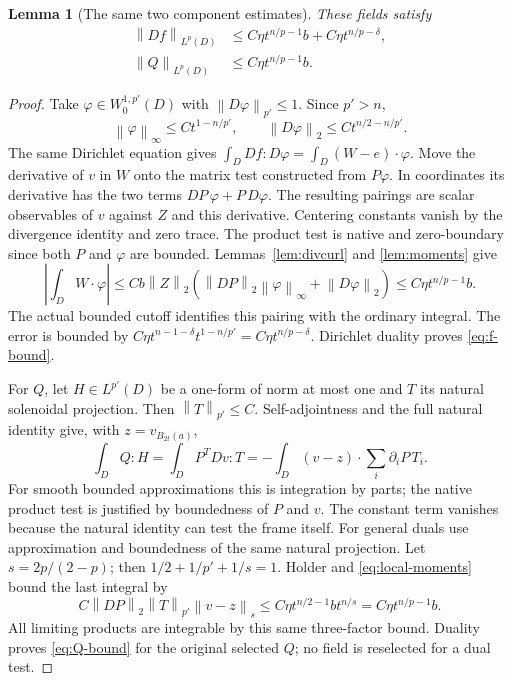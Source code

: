 \documentclass[11pt,a4paper]{article}
\numberwithin{equation}{section}
\newtheorem{lemma}[theorem]{Lemma}
\theoremstyle{definition}
\theoremstyle{remark}
\newcommand{\norm}[1]{\left\lVert#1\right\rVert}
\begin{document}
\begin{lemma}[The same two component estimates]\label{lem:field-bounds}
These fields satisfy
\begin{align}
 \norm{Df}_{L^p(D)}&\leq C\eta t^{n/p-1}b+C\eta t^{n/p-\delta},
                                                   \label{eq:f-bound}\\
 \norm Q_{L^p(D)}&\leq C\eta t^{n/p-1}b.\label{eq:Q-bound}
\end{align}
\end{lemma}
\begin{proof}
Take $\varphi\in W^{1,p'}_0(D)$ with $\norm{D\varphi}_{p'}\leq1$.
Since $p'>n$,
\begin{equation}\label{eq:test-scaling}
 \norm\varphi_\infty\leq Ct^{1-n/p'},\qquad
 \norm{D\varphi}_2\leq Ct^{n/2-n/p'}.
\end{equation}
The same Dirichlet equation gives
$\int_D Df:D\varphi=\int_D(W-e)\cdot\varphi$.
Move the derivative of $v$ in $W$ onto the matrix test constructed
from $P\varphi$. In coordinates its derivative has the two terms
$DP\,\varphi+P\,D\varphi$. The resulting pairings are scalar
observables of $v$ against $Z$ and this derivative. Centering constants
vanish by the divergence identity and zero trace. The product test is
native and zero-boundary since both $P$ and $\varphi$ are bounded.
Lemmas~\ref{lem:divcurl} and \ref{lem:moments} give
\[
 \left|\int_D W\cdot\varphi\right|
 \leq Cb\norm Z_2
       (\norm{DP}_2\norm\varphi_\infty+\norm{D\varphi}_2)
 \leq C\eta t^{n/p-1}b.
\]
The actual bounded cutoff identifies this pairing with the ordinary
integral. The error is bounded by
$C\eta t^{n-1-\delta}t^{1-n/p'}=C\eta t^{n/p-\delta}$.
Dirichlet duality proves \eqref{eq:f-bound}.

For $Q$, let $H\in L^{p'}(D)$ be a one-form of norm at most one and
$T$ its natural solenoidal projection. Then
$\norm T_{p'}\leq C$. Self-adjointness and the full natural identity
give, with $z=v_{B_{2t}(a)}$,
\begin{equation}\label{eq:Q-dual}
 \int_D Q:H=\int_D P^TDv:T
          =-\int_D (v-z)\cdot\sum_i\partial_iP\,T_i.
\end{equation}
For smooth bounded approximations this is integration by parts; the
native product test is justified by boundedness of $P$ and $v$.
The constant term vanishes because the natural identity can test the
frame itself. For general duals use approximation and boundedness of
the same natural projection.
Let $s=2p/(2-p)$; then $1/2+1/p'+1/s=1$. Holder and
\eqref{eq:local-moments} bound the last integral by
\[
 C\norm{DP}_2\norm T_{p'}\norm{v-z}_s
 \leq C\eta t^{n/2-1}bt^{n/s}
 =C\eta t^{n/p-1}b.
\]
All limiting products are integrable by this same three-factor bound.
Duality proves \eqref{eq:Q-bound} for the original selected $Q$;
no field is reselected for a dual test.
\end{proof}
\end{document}
